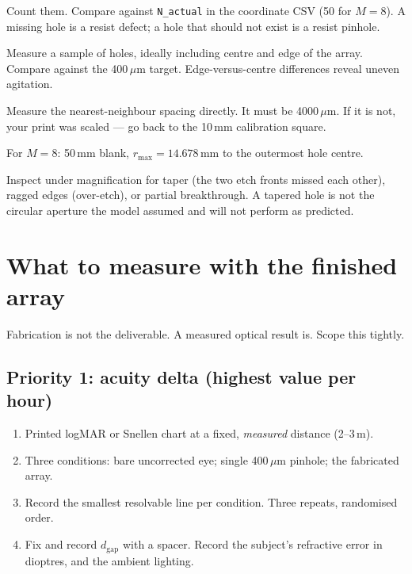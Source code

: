 \documentclass[11pt]{report}
\newcommand{\dgap}{d_{\text{gap}}}
\begin{document}
\begin{description}[leftmargin=0.8cm,style=nextline]
\item[Hole count.] Count them. Compare against \texttt{N\_actual} in the coordinate CSV (50 for
$M=8$). A missing hole is a resist defect; a hole that should not exist is a resist pinhole.

\item[Diameter.] Measure a sample of holes, ideally including centre and edge of the array.
Compare against the 400\,$\mu$m target. Edge-versus-centre differences reveal uneven agitation.

\item[Pitch.] Measure the nearest-neighbour spacing directly. It must be 4000\,$\mu$m. If it is
not, your print was scaled --- go back to the 10\,mm calibration square.

\item[Blank size and $r_{\max}$.] For $M=8$: 50\,mm blank, $r_{\max} = 14.678$\,mm to the
outermost hole centre.

\item[Hole quality.] Inspect under magnification for taper (the two etch fronts missed each
other), ragged edges (over-etch), or partial breakthrough. A tapered hole is not the circular
aperture the model assumed and will not perform as predicted.
\end{description}

\chapter{What to measure with the finished array}

Fabrication is not the deliverable. A measured optical result is. Scope this tightly.

\section{Priority 1: acuity delta (highest value per hour)}

\begin{enumerate}[leftmargin=1.2cm]
\item Printed logMAR or Snellen chart at a fixed, \emph{measured} distance (2--3\,m).
\item Three conditions: bare uncorrected eye; single 400\,$\mu$m pinhole; the fabricated array.
\item Record the smallest resolvable line per condition. Three repeats, randomised order.
\item Fix and record $\dgap$ with a spacer. Record the subject's refractive error in dioptres,
and the ambient lighting.
\end{enumerate}
\end{document}
